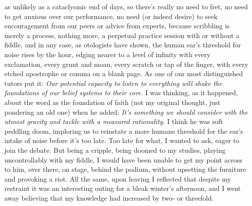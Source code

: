 \documentclass[
]{memoir}
\begin{document}
as unlikely as a cataclysmic end of days, so there's really no need to
fret, no need to get anxious over our performance, no need (or indeed
desire) to seek encouragement from our peers or advice from experts,
because scribbling is merely a process, nothing more, a perpetual
practice session with or without a fiddle, and in any case, as
otologists have shown, the human ear's threshold for noise rises by the
hour, edging nearer to a level of infinity with every exclamation, every
grunt and moan, every scratch or tap of the finger, with every etched
apostrophe or comma on a blank page. As one of our most distinguished
tutors put it: \emph{Our potential capacity to listen to everything will
shake the foundations of our belief systems to their core.} I was
thinking, as it happened, about the word as the foundation of faith (not
my original thought, just pondering an old one) when he added:
\emph{It's something we should consider with the utmost gravity and
tackle with a measured rationality.} I think he was soft peddling doom,
imploring us to reinstate a more humane threshold for the ear's intake
of noise before it's too late. Too late for what, I wanted to ask, eager
to join the debate. But being a cripple, being doomed to my studies,
playing uncontrollably with my fiddle, I would have been unable to get
my point across to him, over there, on stage, behind the podium, without
upsetting the furniture and provoking a riot. All the same, upon leaving
I reflected that despite my restraint it was an interesting outing for a
bleak winter's afternoon, and I went away believing that my knowledge
had increased by two- or threefold.
\end{document}
